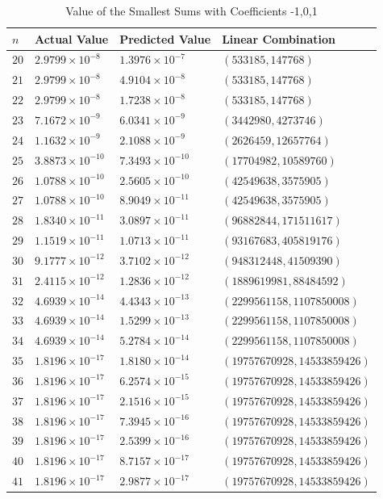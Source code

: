 \documentclass{article}
\numberwithin{equation}{section}
\begin{document}
\renewcommand{\arraystretch}{1.1}
\begin{table}[H]
\caption{Value of the Smallest Sums with Coefficients -1,0,1}
\centering
\begin{tabular}{@{}llll@{}}
\toprule \label{one-indep}
$n$ & Actual Value & Predicted Value & Linear Combination\\ \midrule
$20$ & $2.9799 \times 10^{-8}$  & $1.3976 \times 10^{-7}$  & $(533185,147768)$ \\
$21$ & $2.9799 \times 10^{-8}$  & $4.9104 \times 10^{-8}$  & $(533185,147768)$ \\
$22$ & $2.9799 \times 10^{-8}$  & $1.7238 \times 10^{-8}$  & $(533185,147768)$ \\
$23$ & $7.1672 \times 10^{-9}$  & $6.0341 \times 10^{-9}$  & $(3442980,4273746)$ \\
$24$ & $1.1632 \times 10^{-9}$  & $2.1088 \times 10^{-9}$  & $(2626459,12657764)$ \\
$25$ & $3.8873 \times 10^{-10}$ & $7.3493 \times 10^{-10}$ & $(17704982,10589760)$ \\
$26$ & $1.0788 \times 10^{-10}$ & $2.5605 \times 10^{-10}$ & $(42549638,3575905)$ \\
$27$ & $1.0788 \times 10^{-10}$ & $8.9049 \times 10^{-11}$ & $(42549638,3575905)$ \\
$28$ & $1.8340 \times 10^{-11}$ & $3.0897 \times 10^{-11}$ & $(96882844,171511617)$ \\
$29$ & $1.1519 \times 10^{-11}$ & $1.0713 \times 10^{-11}$ & $(93167683,405819176)$ \\
$30$ & $9.1777 \times 10^{-12}$ & $3.7102 \times 10^{-12}$ & $(948312448,41509390)$ \\
$31$ & $2.4115 \times 10^{-12}$ & $1.2836 \times 10^{-12}$ & $(1889619981,88484592)$ \\
$32$ & $4.6939 \times 10^{-14}$ & $4.4343 \times 10^{-13}$ & $(2299561158,1107850008)$ \\
$33$ & $4.6939 \times 10^{-14}$ & $1.5299 \times 10^{-13}$ & $(2299561158,1107850008)$ \\
$34$ & $4.6939 \times 10^{-14}$ & $5.2784 \times 10^{-14}$ & $(2299561158,1107850008)$ \\
$35$ & $1.8196 \times 10^{-17}$ & $1.8180 \times 10^{-14}$ & $(19757670928,14533859426)$ \\
$36$ & $1.8196 \times 10^{-17}$ & $6.2574 \times 10^{-15}$ & $(19757670928,14533859426)$ \\
$37$ & $1.8196 \times 10^{-17}$ & $2.1516 \times 10^{-15}$ & $(19757670928,14533859426)$ \\
$38$ & $1.8196 \times 10^{-17}$ & $7.3945 \times 10^{-16}$ & $(19757670928,14533859426)$ \\
$39$ & $1.8196 \times 10^{-17}$ & $2.5399 \times 10^{-16}$ & $(19757670928,14533859426)$ \\
$40$ & $1.8196 \times 10^{-17}$ & $8.7157 \times 10^{-17}$ & $(19757670928,14533859426)$ \\
$41$ & $1.8196 \times 10^{-17}$ & $2.9877 \times 10^{-17}$ & $(19757670928,14533859426)$ \\
\bottomrule
\end{tabular}
\end{table}
\end{document}
